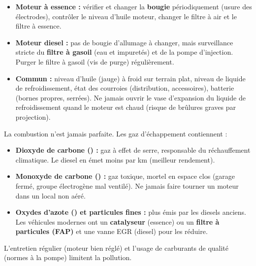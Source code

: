 \documentclass[11pt]{article}
\begin{document}
\begin{propriete}
\begin{itemize}
\item \textbf{Moteur à essence :} vérifier et changer la \textbf{bougie} périodiquement (usure des électrodes), contrôler le niveau d'huile moteur, changer le filtre à air et le filtre à essence.
\item \textbf{Moteur diesel :} pas de bougie d'allumage à changer, mais surveillance stricte du \textbf{filtre à gasoil} (eau et impuretés) et de la pompe d'injection. Purger le filtre à gasoil (vis de purge) régulièrement.
\item \textbf{Commun :} niveau d'huile (jauge) à froid sur terrain plat, niveau de liquide de refroidissement, état des courroies (distribution, accessoires), batterie (bornes propres, serrées). Ne jamais ouvrir le vase d'expansion du liquide de refroidissement quand le moteur est chaud (risque de brûlures graves par projection).
\end{itemize}
\end{propriete}

\begin{propriete}
La combustion n'est jamais parfaite. Les gaz d'échappement contiennent :
\begin{itemize}
\item \textbf{Dioxyde de carbone () :} gaz à effet de serre, responsable du réchauffement climatique. Le diesel en émet moins par km (meilleur rendement).
\item \textbf{Monoxyde de carbone () :} gaz toxique, mortel en espace clos (garage fermé, groupe électrogène mal ventilé). Ne jamais faire tourner un moteur dans un local non aéré.
\item \textbf{Oxydes d'azote () et particules fines :} plus émis par les diesels anciens. Les véhicules modernes ont un \textbf{catalyseur} (essence) ou un \textbf{filtre à particules (FAP)} et une vanne EGR (diesel) pour les réduire.
\end{itemize}
L'entretien régulier (moteur bien réglé) et l'usage de carburants de qualité (normes à la pompe) limitent la pollution.
\end{propriete}
\end{document}
